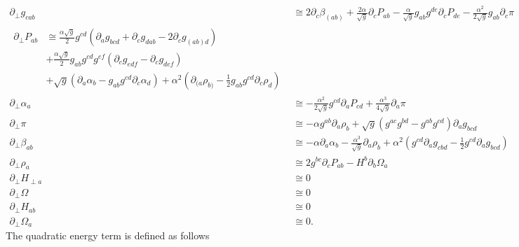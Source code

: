 \begin{subequations}\label{symmetric hamilton}
\begin{align}
\partial_{\perp}g_{cab} & \cong 2\partial_{c}\beta_{(ab)} + \frac{2\alpha}{\sqrt{g}}\partial_{c}P_{ab} - \frac{\alpha}{\sqrt{g}}g_{ab}g^{de}\partial_{c}P_{de} - \frac{\alpha^{2}}{2\sqrt{g}}g_{ab}\partial_{c}\pi\\
\begin{split}
\partial_{\perp}P_{ab} & \cong \frac{\alpha\sqrt{g}}{2}g^{cd}\left(\partial_{a}g_{bcd} + \partial_{c}g_{dab} - 2\partial_{c}g_{(ab)d}\right)\\
& + \frac{\alpha \sqrt{g}}{2}g_{ab}g^{cd}g^{ef}\left(\partial_{c}g_{edf} - \partial_{c}g_{def}\right)\\
& + \sqrt{g}\left(\partial_{a}\alpha_{b} - g_{ab}g^{cd}\partial_{c}\alpha_{d}\right) + \alpha^{2}\left(\partial_{(a}\rho_{b)} - \frac{1}{2}g_{ab}g^{cd}\partial_{c}\rho_{d}\right)
\end{split}\\
\partial_{\perp}\alpha_{a} & \cong -\frac{\alpha^{2}}{2\sqrt{g}}g^{cd}\partial_{a}P_{cd} + \frac{\alpha^{3}}{4\sqrt{g}}\partial_{a}\pi\\
\partial_{\perp}\pi & \cong - \alpha g^{ab}\partial_{a}\rho_{b} + \sqrt{g}\left(g^{ac}g^{bd} - g^{ab}g^{cd}\right)\partial_{a}g_{bcd}\\
\partial_{\perp}\beta_{ab} & \cong -\alpha \partial_{a}\alpha_{b} - \frac{\alpha^{3}}{\sqrt{g}}\partial_{a}\rho_{b} + \alpha^{2}\left(g^{cd}\partial_{a}g_{cbd} - \frac{1}{2}g^{cd}\partial_{a}g_{bcd}\right)\\
\partial_{\perp}\rho_{a} & \cong 2g^{bc}\partial_{c}P_{ab} - H^{b}\partial_{b}\Omega_{a}\\
\partial_{\perp}H_{\perp a} & \cong 0\\
\partial_{\perp}\Omega & \cong 0\\
\partial_{\perp}H_{ab} & \cong 0\\
\partial_{\perp}\Omega_{a} & \cong 0.
\end{align}
\end{subequations}
The quadratic energy term is defined as follows
\tiny
